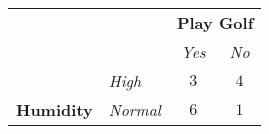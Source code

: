 	\begin{table}[H]
		\centering
		\begin{tabular}{|l|l|c|c|}
		\hline
		\multicolumn{2}{|l|}{} & \multicolumn{2}{l|}{\cellcolor[HTML]{FFCCC9}\textbf{Play Golf}} \\ \cline{3-4} 
		\multicolumn{2}{|l|}{\multirow{-2}{*}{}} & \cellcolor[HTML]{FFCCC9}\textit{Yes} & \cellcolor[HTML]{FFCCC9}\textit{No} \\ \hline
		\cellcolor[HTML]{ECF4FF} & \cellcolor[HTML]{ECF4FF}\textit{High} & $3$ & $4$ \\ \cline{2-4} 
		\multirow{-2}{*}{\cellcolor[HTML]{ECF4FF}\textbf{\phantom{x}Humidity\phantom{xx}}} & \cellcolor[HTML]{ECF4FF}\textit{Normal\phantom{xx}} & $6$ & $1$ \\ \hline
		\end{tabular}
	\end{table}
	
